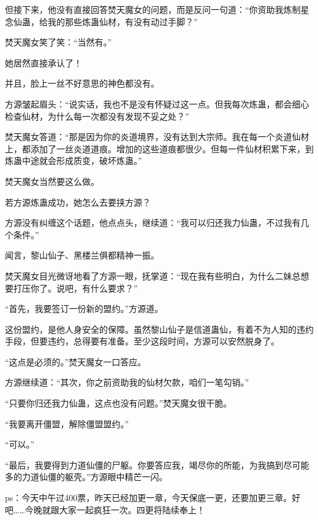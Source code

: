 \begin{this_body}
但接下来，他没有直接回答焚天魔女的问题，而是反问一句道：“你资助我炼制星念仙蛊，给我的那些炼蛊仙材，有没有动过手脚？”

焚天魔女笑了笑：“当然有。”

她居然直接承认了！

并且，脸上一丝不好意思的神色都没有。

方源皱起眉头：“说实话，我也不是没有怀疑过这一点。但我每次炼蛊，都会细心检查仙材，为什么每一次都没有发现不妥之处？”

焚天魔女答道：“那是因为你的炎道境界，没有达到大宗师。我在每一个炎道仙材上，都添加了一丝炎道道痕。增加的这些道痕都很少。但每一件仙材积累下来，到炼蛊中途就会形成质变，破坏炼蛊。”

焚天魔女当然要这么做。

若方源炼蛊成功，她怎么去要挟方源？

方源没有纠缠这个话题，他点点头，继续道：“我可以归还我力仙蛊，不过我有几个条件。”

闻言，黎山仙子、黑楼兰俱都精神一振。

焚天魔女目光微讶地看了方源一眼，抚掌道：“现在我有些明白，为什么二妹总想要打压你了。说吧，有什么要求？”

“首先，我要签订一份新的盟约。”方源道。

这份盟约，是他人身安全的保障。虽然黎山仙子是信道蛊仙，有着不为人知的违约手段，但要违约，总得要有准备。至少这段时间，方源可以安然脱身了。

“这点是必须的。”焚天魔女一口答应。

方源继续道：“其次，你之前资助我的仙材欠款，咱们一笔勾销。”

“只要你归还我力仙蛊，这点也没有问题。”焚天魔女很干脆。

“我要离开僵盟，解除僵盟盟约。”

“可以。”

“最后，我要得到力道仙僵的尸躯。你要答应我，竭尽你的所能，为我搞到尽可能多的力道仙僵的躯壳。”方源眼中精芒一闪。

ps：今天中午过400票，昨天已经加更一章，今天保底一更，还要加更三章。好吧……今晚就跟大家一起疯狂一次。四更将陆续奉上！

\end{this_body}

